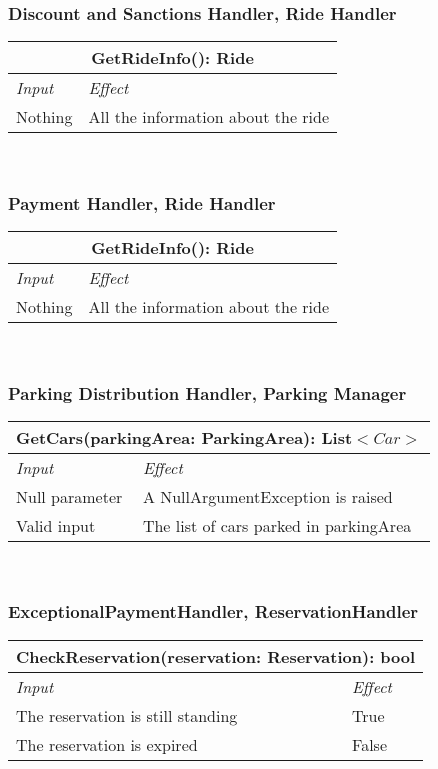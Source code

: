 		
		
		\subsubsection*{Discount and Sanctions Handler, Ride Handler}
			\begin{tabular}{ |l|l| }
				\hline
				\multicolumn{2}{|c|}{GetRideInfo(): Ride}\\
				\hline
				\textit{Input} & \textit{Effect}\\ \hline
				Nothing & All the information about the ride\\ \hline
			\end{tabular}
			\\
		
		
		
		\subsubsection*{Payment Handler, Ride Handler}
			\begin{tabular}{ |l|l| }
				\hline
				\multicolumn{2}{|c|}{GetRideInfo(): Ride}\\
				\hline
				\textit{Input} & \textit{Effect}\\ \hline
				Nothing & All the information about the ride\\ \hline
			\end{tabular}
			\\
		
		
		
		\subsubsection*{Parking Distribution Handler, Parking Manager}
			\begin{tabular}{ |l|l| }
				\hline
				\multicolumn{2}{|c|}{GetCars(parkingArea: ParkingArea): List$<Car>$}\\
				\hline
				\textit{Input} & \textit{Effect}\\ \hline
				Null parameter & A NullArgumentException is raised\\ \hline
				Valid input & The list of cars parked in parkingArea\\ \hline
			\end{tabular}
			\\
		
		
		
		\subsubsection*{ExceptionalPaymentHandler, ReservationHandler}
			\begin{tabular}{ |l|l| }
				\hline
				\multicolumn{2}{|c|}{CheckReservation(reservation: Reservation): bool}\\
				\hline
				\textit{Input} & \textit{Effect}\\ \hline
				The reservation is still standing & True\\ \hline
				The reservation is expired & False\\ \hline
			\end{tabular}
			\\
	
